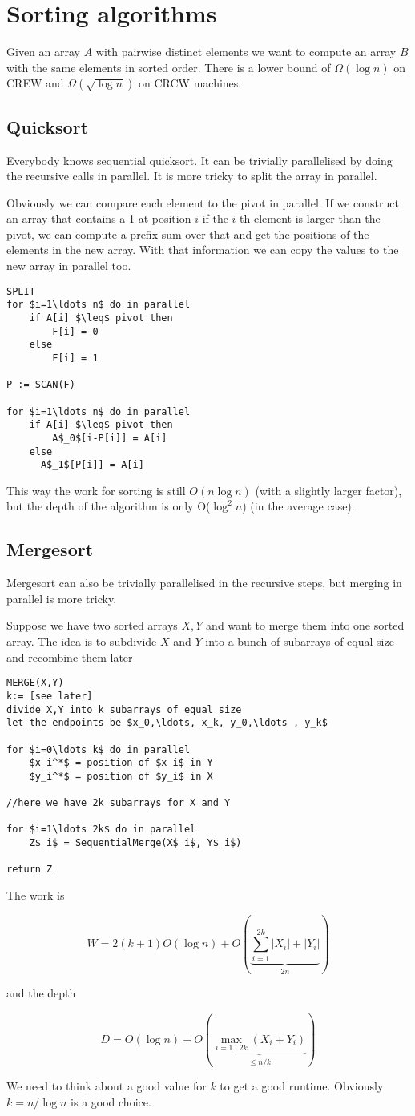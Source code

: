 \section{Sorting algorithms}

Given an array $A$ with pairwise distinct elements we want to compute an array $B$ with the same elements in sorted order. There is a lower bound of $\Omega(\log n)$ on CREW and $\Omega(\sqrt{\log n})$ on CRCW machines.

\subsection{Quicksort}

Everybody knows sequential quicksort. It can be trivially parallelised by doing the recursive calls in parallel. It is more tricky to split the array in parallel.

Obviously we can compare each element to the pivot in parallel. If we construct an array that contains a 1 at position $i$ if the $i$-th element is larger than the pivot, we can compute a prefix sum over that and get the positions of the elements in the new array. With that information we can copy the values to the new array in parallel too.

\begin{lstlisting}
SPLIT
for $i=1\ldots n$ do in parallel
	if A[i] $\leq$ pivot then
		F[i] = 0
	else
		F[i] = 1

P := SCAN(F)

for $i=1\ldots n$ do in parallel
	if A[i] $\leq$ pivot then
		A$_0$[i-P[i]] = A[i]
	else
	  A$_1$[P[i]] = A[i]
\end{lstlisting}

This way the work for sorting is still $O(n\log n)$ (with a slightly larger factor), but the depth of the algorithm is only O($\log^2 n$) (in the average case).

\subsection{Mergesort}

Mergesort can also be trivially parallelised in the recursive steps, but merging in parallel is more tricky.

Suppose we have two sorted arrays $X,Y$ and want to merge them into one sorted array. The idea is to subdivide $X$ and $Y$ into a bunch of subarrays of equal size and recombine them later

\begin{lstlisting}
MERGE(X,Y)
k:= [see later]
divide X,Y into k subarrays of equal size
let the endpoints be $x_0,\ldots, x_k, y_0,\ldots , y_k$

for $i=0\ldots k$ do in parallel
	$x_i^*$ = position of $x_i$ in Y
	$y_i^*$ = position of $y_i$ in X
	
//here we have 2k subarrays for X and Y

for $i=1\ldots 2k$ do in parallel
	Z$_i$ = SequentialMerge(X$_i$, Y$_i$)
	
return Z
\end{lstlisting}

The work is 

\[W=2(k+1)O(\log n) +  O(\underbrace{\sum_{i=1}^{2k} |X_i| + |Y_i|}_{2n})\]

and the depth 

\[D=O(\log n) +O(\underbrace{\max_{i=1\ldots 2k} (X_i+Y_i)}_{\leq n/k})\]

We need to think about a good value for $k$ to get a good runtime. Obviously $k= n/\log n$ is a good choice.
